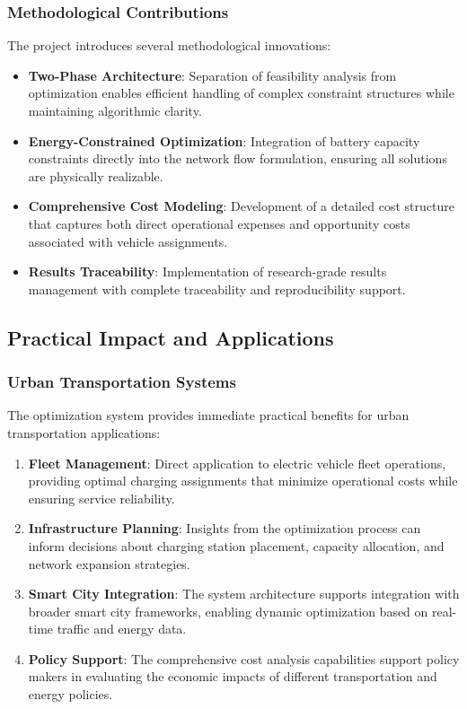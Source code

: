 \documentclass[12pt,a4paper]{article}
\begin{document}
\subsubsection{Methodological Contributions}

The project introduces several methodological innovations:

\begin{itemize}
\item \textbf{Two-Phase Architecture}: Separation of feasibility analysis from optimization enables efficient handling of complex constraint structures while maintaining algorithmic clarity.

\item \textbf{Energy-Constrained Optimization}: Integration of battery capacity constraints directly into the network flow formulation, ensuring all solutions are physically realizable.

\item \textbf{Comprehensive Cost Modeling}: Development of a detailed cost structure that captures both direct operational expenses and opportunity costs associated with vehicle assignments.

\item \textbf{Results Traceability}: Implementation of research-grade results management with complete traceability and reproducibility support.
\end{itemize}

\subsection{Practical Impact and Applications}

\subsubsection{Urban Transportation Systems}

The optimization system provides immediate practical benefits for urban transportation applications:

\begin{enumerate}
\item \textbf{Fleet Management}: Direct application to electric vehicle fleet operations, providing optimal charging assignments that minimize operational costs while ensuring service reliability.

\item \textbf{Infrastructure Planning}: Insights from the optimization process can inform decisions about charging station placement, capacity allocation, and network expansion strategies.

\item \textbf{Smart City Integration}: The system architecture supports integration with broader smart city frameworks, enabling dynamic optimization based on real-time traffic and energy data.

\item \textbf{Policy Support}: The comprehensive cost analysis capabilities support policy makers in evaluating the economic impacts of different transportation and energy policies.
\end{enumerate}
\end{document}
